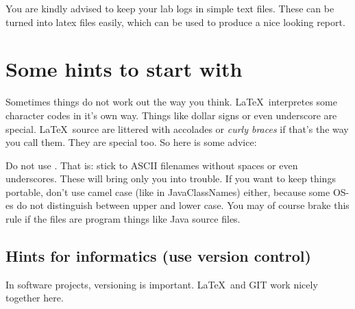 
You are kindly advised to keep your lab logs in simple text
files. These can be turned into latex files easily,
which can be used to produce a nice looking report.
\clearpage 
\section{Some hints to start with}
Sometimes things do not work out the way you think.
\LaTeX\ interpretes some character codes in it's own way.
Things like dollar signs or even underscore are special.
\LaTeX\ source are littered with accolades or \textit{curly braces} if that's
the way you call them. They are special too. So here is some advice: 

Do not use . That is: stick to ASCII filenames without spaces or even underscores. 
These will bring only you into trouble. If you want to keep things portable, 
don't use camel case (like in JavaClassNames) either, because
some OS-es do not distinguish between upper and lower case. You may of
course brake this rule if the files are program things like
Java source files.

\subsection{Hints for informatics (use version control)}
In software projects, versioning is important. \LaTeX\ and \textsc{GIT}
work nicely together here.

